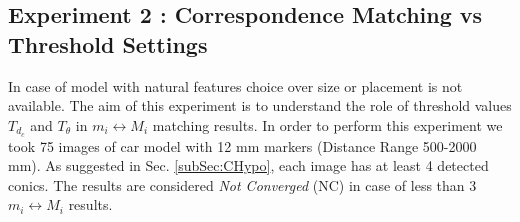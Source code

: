 \documentclass{bmvc2k}
\begin{document}
\subsection{Experiment 2 : Correspondence Matching vs Threshold Settings}
In case of model with natural features choice over size or placement is not available.
The aim of this experiment is to understand the role of threshold values $ T_{d_c}$ and $ T_\theta $ in $ m_i \leftrightarrow M_i $ matching results. 
In order to perform this experiment we took 75 images of car model with 12 mm markers (Distance Range 500-2000 mm). 
As suggested in Sec. \ref{subSec:CHypo}, each image has at least 4 detected conics. 
The results are considered \textit{Not Converged} (NC) in case of less than 3 $ m_i \leftrightarrow M_i $ results.

\end{document}
